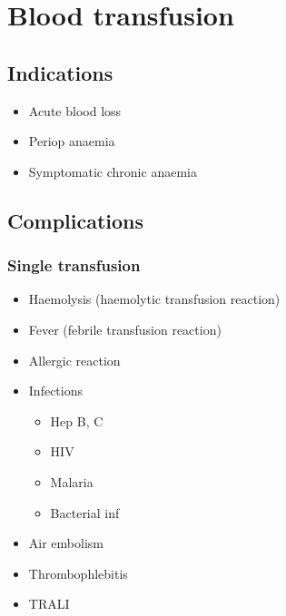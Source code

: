 \documentclass[
  14pt,
]{memoir}
\providecommand{\tightlist}{%
  \setlength{\itemsep}{0pt}\setlength{\parskip}{0pt}}
\begin{document}
\pagebreak

\hypertarget{blood-transfusion}{%
\chapter{Blood transfusion}\label{blood-transfusion}}

\hypertarget{indications}{%
\section{Indications}\label{indications}}

\begin{itemize}
\tightlist
\item
  Acute blood loss
\item
  Periop anaemia
\item
  Symptomatic chronic anaemia
\end{itemize}

\hypertarget{complications}{%
\section{Complications}\label{complications}}

\hypertarget{single-transfusion}{%
\subsection{Single transfusion}\label{single-transfusion}}

\begin{itemize}
\tightlist
\item
  Haemolysis (haemolytic transfusion reaction)
\item
  Fever (febrile transfusion reaction)
\item
  Allergic reaction
\item
  Infections

  \begin{itemize}
  \tightlist
  \item
    Hep B, C
  \item
    HIV
  \item
    Malaria
  \item
    Bacterial inf
  \end{itemize}
\item
  Air embolism
\item
  Thrombophlebitis
\item
  TRALI
\end{itemize}
\end{document}
